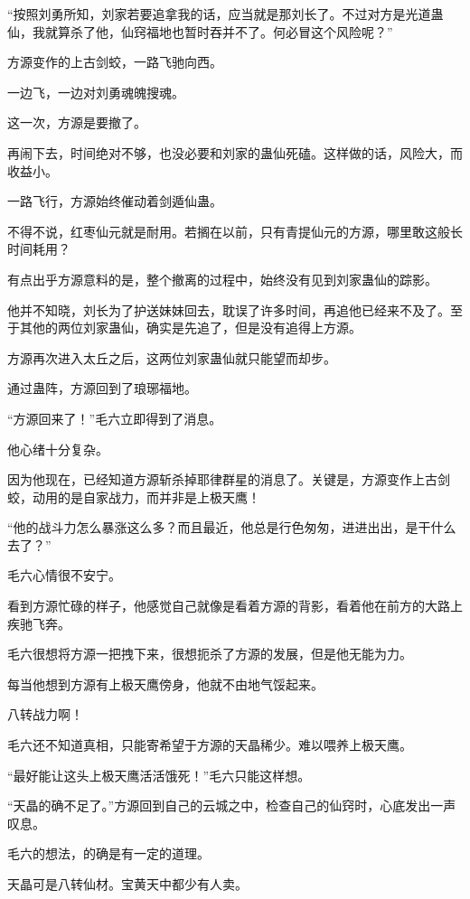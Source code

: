 
\begin{this_body}

“按照刘勇所知，刘家若要追拿我的话，应当就是那刘长了。不过对方是光道蛊仙，我就算杀了他，仙窍福地也暂时吞并不了。何必冒这个风险呢？”

方源变作的上古剑蛟，一路飞驰向西。

一边飞，一边对刘勇魂魄搜魂。

这一次，方源是要撤了。

再闹下去，时间绝对不够，也没必要和刘家的蛊仙死磕。这样做的话，风险大，而收益小。

一路飞行，方源始终催动着剑遁仙蛊。

不得不说，红枣仙元就是耐用。若搁在以前，只有青提仙元的方源，哪里敢这般长时间耗用？

有点出乎方源意料的是，整个撤离的过程中，始终没有见到刘家蛊仙的踪影。

他并不知晓，刘长为了护送妹妹回去，耽误了许多时间，再追他已经来不及了。至于其他的两位刘家蛊仙，确实是先追了，但是没有追得上方源。

方源再次进入太丘之后，这两位刘家蛊仙就只能望而却步。

通过蛊阵，方源回到了琅琊福地。

“方源回来了！”毛六立即得到了消息。

他心绪十分复杂。

因为他现在，已经知道方源斩杀掉耶律群星的消息了。关键是，方源变作上古剑蛟，动用的是自家战力，而并非是上极天鹰！

“他的战斗力怎么暴涨这么多？而且最近，他总是行色匆匆，进进出出，是干什么去了？”

毛六心情很不安宁。

看到方源忙碌的样子，他感觉自己就像是看着方源的背影，看着他在前方的大路上疾驰飞奔。

毛六很想将方源一把拽下来，很想扼杀了方源的发展，但是他无能为力。

每当他想到方源有上极天鹰傍身，他就不由地气馁起来。

八转战力啊！

毛六还不知道真相，只能寄希望于方源的天晶稀少。难以喂养上极天鹰。

“最好能让这头上极天鹰活活饿死！”毛六只能这样想。

“天晶的确不足了。”方源回到自己的云城之中，检查自己的仙窍时，心底发出一声叹息。

毛六的想法，的确是有一定的道理。

天晶可是八转仙材。宝黄天中都少有人卖。


\end{this_body}

